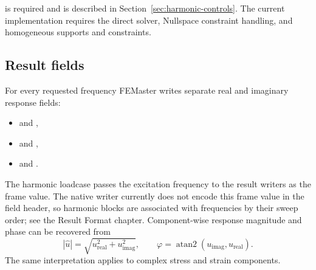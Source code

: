  is required and is described in Section~\ref{sec:harmonic-controls}. The current implementation requires the direct solver, Nullspace constraint handling, and homogeneous supports and constraints.

\subsection{Result fields}

For every requested frequency FEMaster writes separate real and imaginary response fields:

\begin{itemize}
\item {} and ,
\item {} and ,
\item {} and .
\end{itemize}

The harmonic loadcase passes the excitation frequency to the result writers as the frame value. The native  writer currently does not encode this frame value in the field header, so harmonic  blocks are associated with frequencies by their sweep order; see the Result Format chapter. Component-wise response magnitude and phase can be recovered from
\[
|\hat u|=\sqrt{u_\mathrm{real}^2+u_\mathrm{imag}^2},
\qquad
\varphi=\operatorname{atan2}(u_\mathrm{imag},u_\mathrm{real}) .
\]
The same interpretation applies to complex stress and strain components.
